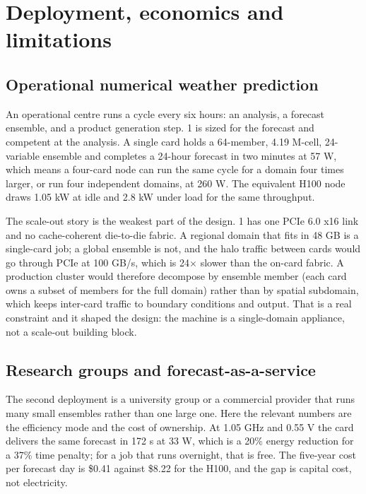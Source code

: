 \FloatBarrier
\section{Deployment, economics and limitations}\label{sec:deployment}

\subsection{Operational numerical weather prediction}
An operational centre runs a cycle every six hours: an analysis, a forecast ensemble, and a
product generation step. \ac{1} is sized for the forecast and competent at the analysis. A
single card holds a 64-member, 4.19 M-cell, 24-variable ensemble and completes a 24-hour forecast
in two minutes at 57 W, which means a four-card node can run the same cycle for a domain four
times larger, or run four independent domains, at 260 W. The equivalent H100 node draws 1.05 kW at
idle and 2.8 kW under load for the same throughput.

The scale-out story is the weakest part of the design. \ac{1} has one PCIe 6.0 x16 link and no
cache-coherent die-to-die fabric. A regional domain that fits in 48 GB is a single-card job; a
global ensemble is not, and the halo traffic between cards would go through PCIe at 100 GB/s,
which is 24$\times$ slower than the on-card fabric. A production cluster would therefore
decompose by ensemble member (each card owns a subset of members for the full domain) rather than
by spatial subdomain, which keeps inter-card traffic to boundary conditions and output. That is a
real constraint and it shaped the design: the machine is a single-domain appliance, not a
scale-out building block.

\subsection{Research groups and forecast-as-a-service}
The second deployment is a university group or a commercial provider that runs many small
ensembles rather than one large one. Here the relevant numbers are the efficiency mode and the
cost of ownership. At 1.05 GHz and 0.55 V the card delivers the same forecast in 172 s at 33 W,
which is a 20\% energy reduction for a 37\% time penalty; for a job that runs overnight, that is
free. The five-year cost per forecast day is \$0.41 against \$8.22 for the H100, and the gap is
capital cost, not electricity.

